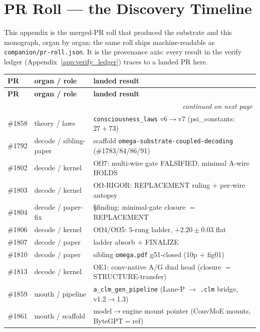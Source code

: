\section{PR Roll --- the Discovery Timeline}
\label{app:pr_roll}

This appendix is the merged-PR roll that produced the substrate and this
monograph, organ by organ; the same roll ships machine-readable as
\texttt{companion/pr-roll.json}. It is the provenance axis: every result in the
verify ledger (Appendix~\ref{app:verify_ledger}) traces to a landed PR here.

\begin{center}
\footnotesize
\setlength{\tabcolsep}{4pt}
\begin{longtable}{@{}l l l@{}}
\toprule
\textbf{PR} & \textbf{organ / role} & \textbf{landed result} \\
\midrule
\endfirsthead
\toprule
\textbf{PR} & \textbf{organ / role} & \textbf{landed result} \\
\midrule
\endhead
\midrule \multicolumn{3}{r}{\footnotesize\itshape continued on next page} \\
\endfoot
\bottomrule
\endlastfoot
\#1858 & theory / laws        & \texttt{consciousness\_laws} v6$\to$v7 (psi\_constants: $27{+}73$) \\
\#1792 & decode / sibling-paper & scaffold \texttt{omega-substrate-coupled-decoding} (\#1783/84/86/91) \\
\#1802 & decode / kernel      & OΩ7: multi-wire gate FALSIFIED, minimal A-wire HOLDS \\
\#1803 & decode / kernel      & OΩ-RIGOR: REPLACEMENT ruling $+$ per-wire autopsy \\
\#1804 & decode / paper-fix   & §finding: minimal-gate closure $=$ REPLACEMENT \\
\#1806 & decode / kernel      & OΩ4/OΩ5: $5$-rung ladder, $+2.20\pm0.03$ flat \\
\#1807 & decode / paper       & ladder absorb $+$ FINALIZE \\
\#1810 & decode / paper       & sibling \texttt{omega.pdf} g51-closed ($10$p $+$ fig01) \\
\#1813 & decode / kernel      & OE1: conv-native A/G dual head (closure $=$ STRUCTURE-transfer) \\
\#1859 & mouth / pipeline     & \texttt{a\_clm\_gen\_pipeline} (Lane-P $\to$ \texttt{.clm} bridge, v1.2$\to$1.3) \\
\#1861 & mouth / scaffold     & model$\to$engine mount pointer (ConvMoE mounts, ByteGPT$=$ref) \\

\end{longtable}
\end{center}
